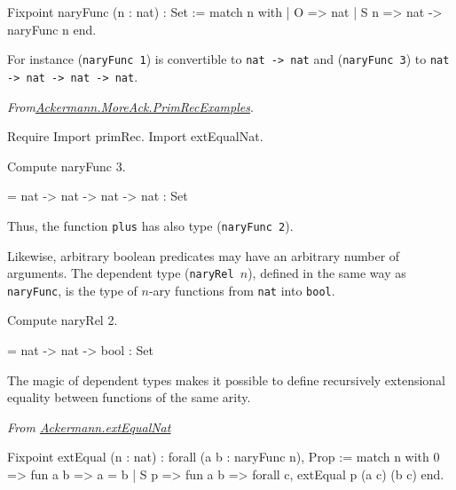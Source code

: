 \begin{Coqsrc}
Fixpoint naryFunc (n : nat) : Set :=
  match n with
  | O => nat
  | S n => nat -> naryFunc n
  end.
\end{Coqsrc}

For instance (\texttt{naryFunc 1}) is convertible to \texttt{nat -> nat} and (\texttt{naryFunc 3})
to \texttt{nat -> nat -> nat -> nat}.

\vspace{4pt}
\noindent
\emph{From\href{../theories/html/hydras.Ackermann.MoreAck.PrimRecExamples.html}{Ackermann.MoreAck.PrimRecExamples}}.
\begin{Coqsrc}
Require Import primRec.
Import extEqualNat.

Compute naryFunc 3.
\end{Coqsrc}

\begin{Coqanswer}
= nat -> nat -> nat -> nat
  : Set  
\end{Coqanswer}

Thus, the function \texttt{plus} has also type (\texttt{naryFunc 2}).

Likewise, arbitrary boolean predicates may have an arbitrary number of arguments. The dependent type
(\texttt{naryRel $n$}), defined in the same way as \texttt{naryFunc}, is the type of $n$-ary functions from
\texttt{nat} into \texttt{bool}.

\begin{Coqsrc}
Compute naryRel 2.
\end{Coqsrc}

\begin{Coqanswer}
 = nat -> nat -> bool
     : Set
\end{Coqanswer}

The magic of dependent types makes it possible to define recursively extensional equality between functions of the same arity.

\vspace{4pt}
\noindent
\emph{From \href{../theories/html/hydras.Ackermann.extEqualNat.html}{Ackermann.extEqualNat}}


\begin{Coqsrc}
Fixpoint  extEqual (n : nat) : forall  (a b : naryFunc n), Prop :=
  match n with
    0 => fun a b => a = b
  | S p => fun a b => forall c, extEqual p (a c) (b c)
  end.
\end{Coqsrc}

